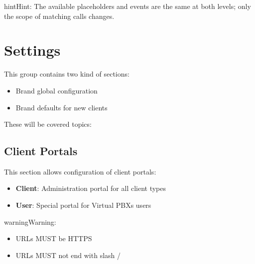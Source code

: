 \documentclass[letterpaper,10pt,english]{sphinxmanual}
\begin{document}
\begin{notice}{hint}{Hint:}
The available placeholders and events are the same at both levels; only the scope of matching
calls changes.
\end{notice}


\section{Settings}
\label{administration_portal/brand/settings/index::doc}\label{administration_portal/brand/settings/index:settings}
This group contains two kind of sections:
\begin{itemize}
\item {} 
Brand global configuration

\item {} 
Brand defaults for new clients

\end{itemize}

These will be covered topics:
\label{administration_portal/brand/settings/client_portals:client-portals}

\subsection{Client Portals}
\label{administration_portal/brand/settings/client_portals:client-portals}\label{administration_portal/brand/settings/client_portals:id2}\label{administration_portal/brand/settings/client_portals::doc}\label{administration_portal/brand/settings/client_portals:id1}
This section allows configuration of client portals:
\begin{itemize}
\item {} 
\textbf{Client}: Administration portal for all client types

\item {} 
\textbf{User}: Special portal for Virtual PBXs users

\end{itemize}

\begin{notice}{warning}{Warning:}\begin{itemize}
\item {} 
URLs MUST be HTTPS

\item {} 
URLs MUST not end with slash /

\end{itemize}
\end{notice}
\end{document}
